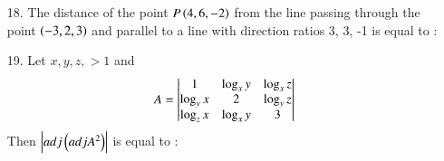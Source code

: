 \documentclass[journal,12pt,onecolumn]{IEEEtran}
\theoremstyle{remark}
\begin{document}
\begin{enumerate}
    \item[18.] The distance of the point $P\left(4, 6, -2\right)$ from the line passing through
        the point $\left(-3, 2, 3\right)$ and parallel to a line with direction ratios 3, 3, -1 is
        equal to :
        \hfill{}
        \begin{enumerate}
        \end{enumerate}
        \begin{figure}[ht]
            \centering
        \end{figure}
    \item[19.]  Let $x, y, z, > 1$ and   
        \begin{align}
            A = \begin{vmatrix}1 & \log_x y & \log_x z \\ \log_y x & 2 & \log_y z \\
            \log_z x & \log_x y & 3\end{vmatrix}
        \end{align} 
        Then $\left\vert adj\left(adjA^2\right)\right\vert$ is equal to :
        \hfill{}
        \begin{enumerate}
        \end{enumerate}


\end{enumerate}
\end{document}
